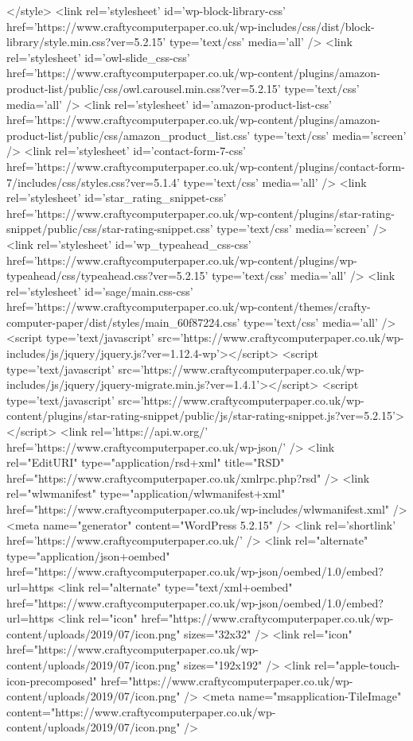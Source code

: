 </style>
	<link rel='stylesheet' id='wp-block-library-css'  href='https://www.craftycomputerpaper.co.uk/wp-includes/css/dist/block-library/style.min.css?ver=5.2.15' type='text/css' media='all' />
<link rel='stylesheet' id='owl-slide_css-css'  href='https://www.craftycomputerpaper.co.uk/wp-content/plugins/amazon-product-list/public/css/owl.carousel.min.css?ver=5.2.15' type='text/css' media='all' />
<link rel='stylesheet' id='amazon-product-list-css'  href='https://www.craftycomputerpaper.co.uk/wp-content/plugins/amazon-product-list/public/css/amazon_product_list.css' type='text/css' media='screen' />
<link rel='stylesheet' id='contact-form-7-css'  href='https://www.craftycomputerpaper.co.uk/wp-content/plugins/contact-form-7/includes/css/styles.css?ver=5.1.4' type='text/css' media='all' />
<link rel='stylesheet' id='star_rating_snippet-css'  href='https://www.craftycomputerpaper.co.uk/wp-content/plugins/star-rating-snippet/public/css/star-rating-snippet.css' type='text/css' media='screen' />
<link rel='stylesheet' id='wp_typeahead_css-css'  href='https://www.craftycomputerpaper.co.uk/wp-content/plugins/wp-typeahead/css/typeahead.css?ver=5.2.15' type='text/css' media='all' />
<link rel='stylesheet' id='sage/main.css-css'  href='https://www.craftycomputerpaper.co.uk/wp-content/themes/crafty-computer-paper/dist/styles/main_60f87224.css' type='text/css' media='all' />
<script type='text/javascript' src='https://www.craftycomputerpaper.co.uk/wp-includes/js/jquery/jquery.js?ver=1.12.4-wp'></script>
<script type='text/javascript' src='https://www.craftycomputerpaper.co.uk/wp-includes/js/jquery/jquery-migrate.min.js?ver=1.4.1'></script>
<script type='text/javascript' src='https://www.craftycomputerpaper.co.uk/wp-content/plugins/star-rating-snippet/public/js/star-rating-snippet.js?ver=5.2.15'></script>
<link rel='https://api.w.org/' href='https://www.craftycomputerpaper.co.uk/wp-json/' />
<link rel="EditURI" type="application/rsd+xml" title="RSD" href="https://www.craftycomputerpaper.co.uk/xmlrpc.php?rsd" />
<link rel="wlwmanifest" type="application/wlwmanifest+xml" href="https://www.craftycomputerpaper.co.uk/wp-includes/wlwmanifest.xml" /> 
<meta name="generator" content="WordPress 5.2.15" />
<link rel='shortlink' href='https://www.craftycomputerpaper.co.uk/' />
<link rel="alternate" type="application/json+oembed" href="https://www.craftycomputerpaper.co.uk/wp-json/oembed/1.0/embed?url=https%
<link rel="alternate" type="text/xml+oembed" href="https://www.craftycomputerpaper.co.uk/wp-json/oembed/1.0/embed?url=https%
<link rel="icon" href="https://www.craftycomputerpaper.co.uk/wp-content/uploads/2019/07/icon.png" sizes="32x32" />
<link rel="icon" href="https://www.craftycomputerpaper.co.uk/wp-content/uploads/2019/07/icon.png" sizes="192x192" />
<link rel="apple-touch-icon-precomposed" href="https://www.craftycomputerpaper.co.uk/wp-content/uploads/2019/07/icon.png" />
<meta name="msapplication-TileImage" content="https://www.craftycomputerpaper.co.uk/wp-content/uploads/2019/07/icon.png" />
  
